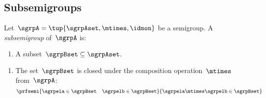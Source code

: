 
\subsection{Subsemigroups}


\begin{definition}
    Let~$\sgrpA = \tup{\sgrpAset, \mtimes, \idmon}$ be a semigroup.
    A \emph{subsemigroup} of~$\sgrpA$ is:

    \constit

    \begin{enumerate}
        \item A subset~$\sgrpBset \subseteq \sgrpAset$.
    \end{enumerate}

    \condit

    \begin{enumerate}
        \item The set~$\sgrpBset$ is closed under the composition operation~$\mtimes$ from~$\sgrpA$:
              \begin{equation*}
                  \prfsemi{\sgrpela \in \sgrpBset \quad \sgrpelb \in \sgrpBset}{\sgrpela \mtimes \sgrpelb \in \sgrpBset}
              \end{equation*}
    \end{enumerate}
\end{definition}

